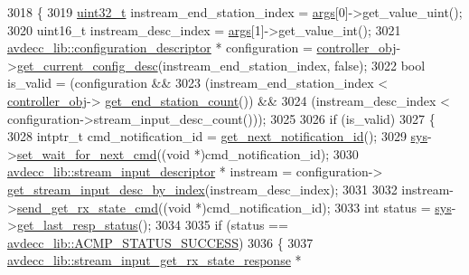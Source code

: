 \begin{DoxyCode}
3018 \{
3019     \hyperlink{parse_8c_a6eb1e68cc391dd753bc8ce896dbb8315}{uint32\_t} instream\_end\_station\_index = \hyperlink{namespaceastime__fitline_a8187411843a6284ffb964ef3fb9fcab3}{args}[0]->get\_value\_uint();
3020     uint16\_t instream\_desc\_index = \hyperlink{namespaceastime__fitline_a8187411843a6284ffb964ef3fb9fcab3}{args}[1]->get\_value\_int();
3021     \hyperlink{classavdecc__lib_1_1configuration__descriptor}{avdecc\_lib::configuration\_descriptor} * configuration = 
      \hyperlink{classcmd__line_af0a7784509e5bf1210a2aa19cea5df70}{controller\_obj}->\hyperlink{classavdecc__lib_1_1controller_af249ed146464b54d7fc9d87f67bcff46}{get\_current\_config\_desc}(instream\_end\_station\_index, \textcolor{keyword}{
      false});
3022     \textcolor{keywordtype}{bool} is\_valid = (configuration &&
3023                      (instream\_end\_station\_index < \hyperlink{classcmd__line_af0a7784509e5bf1210a2aa19cea5df70}{controller\_obj}->
      \hyperlink{classavdecc__lib_1_1controller_ab5ddf7b4a9718fe3e821289141f44485}{get\_end\_station\_count}()) &&
3024                      (instream\_desc\_index < configuration->stream\_input\_desc\_count()));
3025 
3026     \textcolor{keywordflow}{if} (is\_valid)
3027     \{
3028         intptr\_t cmd\_notification\_id = \hyperlink{classcmd__line_a57486218387d1aa9d262eb7c176154ad}{get\_next\_notification\_id}();
3029         \hyperlink{classcmd__line_a485db4800e331cb4052c447fdf5d154e}{sys}->\hyperlink{classavdecc__lib_1_1system_a26b769584f10225077da47583edda33e}{set\_wait\_for\_next\_cmd}((\textcolor{keywordtype}{void} *)cmd\_notification\_id);
3030         \hyperlink{classavdecc__lib_1_1stream__input__descriptor}{avdecc\_lib::stream\_input\_descriptor} * instream = configuration->
      \hyperlink{classavdecc__lib_1_1configuration__descriptor_a69cfe9032cea21937b4153878f8a925c}{get\_stream\_input\_desc\_by\_index}(instream\_desc\_index);
3031 
3032         instream->\hyperlink{classavdecc__lib_1_1stream__input__descriptor_a7d6da6754f8090e30071f19b30ff8bb1}{send\_get\_rx\_state\_cmd}((\textcolor{keywordtype}{void} *)cmd\_notification\_id);
3033         \textcolor{keywordtype}{int} status = \hyperlink{classcmd__line_a485db4800e331cb4052c447fdf5d154e}{sys}->\hyperlink{classavdecc__lib_1_1system_aa63e8d1a4e51f695cdcccc9340922407}{get\_last\_resp\_status}();
3034 
3035         \textcolor{keywordflow}{if} (status == \hyperlink{namespaceavdecc__lib_ae0a51eed2d4dfed01460049a240d6f34a6e7347496acf3a05a9b3dab05deb8765}{avdecc\_lib::ACMP\_STATUS\_SUCCESS})
3036         \{
3037             \hyperlink{classavdecc__lib_1_1stream__input__get__rx__state__response}{avdecc\_lib::stream\_input\_get\_rx\_state\_response} * 

\end{DoxyCode}
